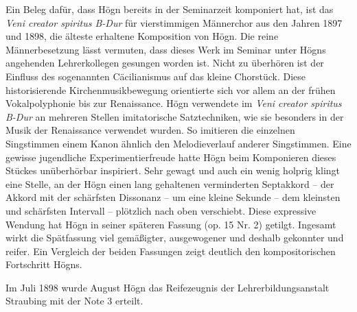 Ein Beleg dafür, dass Högn bereits in der Seminarzeit komponiert hat,
ist das \textit{Veni creator spiritus B-Dur} für vierstimmigen
Männerchor aus den Jahren 1897 und 1898, die älteste erhaltene
Komposition von Högn. Die reine Männerbesetzung lässt vermuten, dass
dieses Werk im Seminar unter Högns angehenden Lehrerkollegen gesungen
worden ist. Nicht zu überhören ist der Einfluss des sogenannten
Cäcilianismus auf das kleine Chorstück. Diese historisierende
Kirchenmusikbewegung orientierte sich vor allem an der frühen
Vokalpolyphonie bis zur Renaissance. Högn verwendete im \textit{Veni
creator spiritus B-Dur} an mehreren Stellen imitatorische
Satztechniken, wie sie besonders in der Musik der Renaissance verwendet
wurden. So imitieren die einzelnen Singstimmen einem Kanon ähnlich den
Melodieverlauf anderer Singstimmen. Eine gewisse jugendliche
Experimentierfreude hatte Högn beim Komponieren dieses Stückes
unüberhörbar inspiriert. Sehr gewagt und auch ein wenig holprig klingt
eine Stelle, an der Högn einen lang gehaltenen verminderten Septakkord
– der Akkord mit der schärfsten Dissonanz – um eine kleine Sekunde –
dem kleinsten und schärfsten Intervall – plötzlich nach oben
verschiebt. Diese expressive Wendung hat Högn in seiner späteren
Fassung (op. 15 Nr. 2) getilgt. Ingesamt wirkt die Spätfassung viel
gemäßigter, ausgewogener und deshalb gekonnter und reifer. Ein
Vergleich der beiden Fassungen zeigt deutlich den kompositorischen
Fortschritt Högns.

Im Juli 1898 wurde August Högn das Reifezeugnis der
Lehrerbildungsanstalt Straubing mit der Note 3 erteilt.